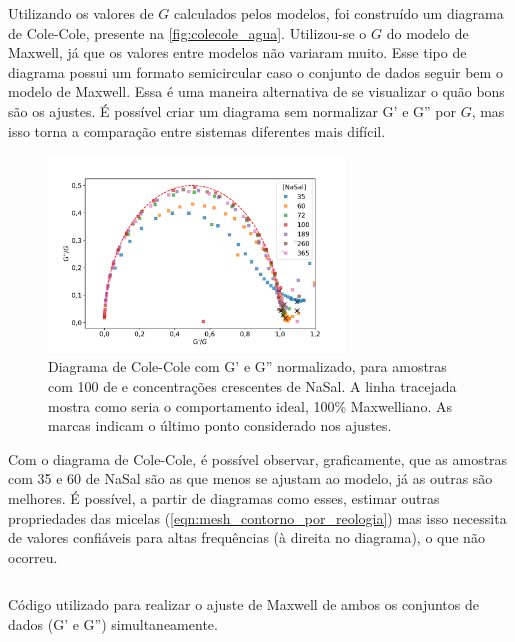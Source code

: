 	Utilizando os valores de \(G\) calculados pelos modelos, foi construído um diagrama de Cole-Cole, presente na \autoref{fig:colecole_agua}. Utilizou-se o \(G\) do modelo de Maxwell, já que os valores entre modelos não variaram muito. Esse tipo de diagrama possui um formato semicircular caso o conjunto de dados seguir bem o modelo de Maxwell. Essa é uma maneira alternativa de se visualizar o quão bons são os ajustes. É possível criar um diagrama sem normalizar G' e G'' por \(G\), mas isso torna a comparação entre sistemas diferentes mais difícil.

		\begin{figure}
			\centering
			\includegraphics[width=0.7\textwidth]{imagens/reologia/colecole_agua}
			\caption{Diagrama de Cole-Cole com G' e G'' normalizado, para amostras com 100 \mM{} de \CTAB{} e concentrações crescentes de NaSal. A linha tracejada mostra como seria o comportamento ideal, 100\% Maxwelliano. As marcas indicam o último ponto considerado nos ajustes.}
			\label{fig:colecole_agua}
		\end{figure}

	Com o diagrama de Cole-Cole, é possível observar, graficamente, que as amostras com 35 e 60 \mM{} de NaSal são as que menos se ajustam ao modelo, já as outras são melhores. É possível, a partir de diagramas como esses, estimar outras propriedades das micelas (\autoref{eqn:mesh_contorno_por_reologia}) mas isso necessita de valores confiáveis para altas frequências (à direita no diagrama), o que não ocorreu. %
	
	\begin{listing}[h]
		\inputminted{python}{./python/ajuste_maxwell.py}
		\caption{Código utilizado para realizar o ajuste de Maxwell de ambos os conjuntos de dados (G' e G'') simultaneamente.}
		\label{lst:ajuste_maxwell}
	\end{listing}
	
